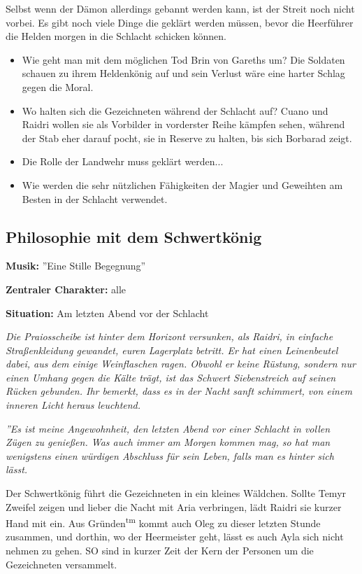 Selbst wenn der Dämon allerdings gebannt werden kann, ist der Streit noch nicht vorbei. Es gibt noch viele Dinge die geklärt werden müssen, bevor die Heerführer die Helden morgen in die Schlacht schicken können.

\begin{itemize}
\item Wie geht man mit dem möglichen Tod Brin von Gareths um? Die Soldaten schauen zu ihrem Heldenkönig auf und sein Verlust wäre eine harter Schlag gegen die Moral.
\item Wo halten sich die Gezeichneten während der Schlacht auf? Cuano und Raidri wollen sie als Vorbilder in vorderster Reihe kämpfen sehen, während der Stab eher darauf pocht, sie in Reserve zu halten, bis sich Borbarad zeigt.
\item Die Rolle der Landwehr muss geklärt werden...
\item Wie werden die sehr nützlichen Fähigkeiten der Magier und Geweihten am Besten in der Schlacht verwendet.
\end{itemize}

\subsection{Philosophie mit dem Schwertkönig}
\textbf{Musik:} ''Eine Stille Begegnung''

\textbf{Zentraler Charakter:} alle

\textbf{Situation:} Am letzten Abend vor der Schlacht 

\emph{Die Praiosscheibe ist hinter dem Horizont versunken, als Raidri, in einfache Straßenkleidung gewandet, euren Lagerplatz betritt. Er hat einen Leinenbeutel dabei, aus dem einige Weinflaschen ragen. Obwohl er keine Rüstung, sondern nur einen Umhang gegen die Kälte trägt, ist das Schwert Siebenstreich auf seinen Rücken gebunden. Ihr bemerkt, dass es in der Nacht sanft schimmert, von einem inneren Licht heraus leuchtend.}

\emph{''Es ist meine Angewohnheit, den letzten Abend vor einer Schlacht in vollen Zügen zu genießen. Was auch immer am Morgen kommen mag, so hat man wenigstens einen würdigen Abschluss für sein Leben, falls man es hinter sich lässt.}

Der Schwertkönig führt die Gezeichneten in ein kleines Wäldchen. Sollte Temyr Zweifel zeigen und lieber die Nacht mit Aria verbringen, lädt Raidri sie kurzer Hand mit ein. Aus Gründen\textsuperscript{tm} kommt auch Oleg zu dieser letzten Stunde zusammen, und dorthin, wo der Heermeister geht, lässt es auch Ayla sich nicht nehmen zu gehen. SO sind in kurzer Zeit der Kern der Personen um die Gezeichneten versammelt.


